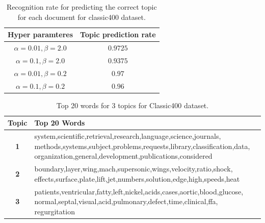 \documentclass[twoside,12pt]{article}
\begin{document}
\begin{table}[!]
\begin{center}
\begin{tabular}{| c | c |} 
\hline
\textbf{Hyper paramteres}& \textbf{Topic prediction rate}  \\ \hline

$\alpha=0.01,\beta=2.0$ & $0.9725$ \\ \hline
$\alpha=0.1,\beta=2.0$ &  $0.9375$ \\ \hline
$\alpha=0.01,\beta=0.2$ & $0.97$ \\ \hline
$\alpha=0.1,\beta=0.2$ & $0.96$ \\ \hline
 
\end{tabular}
\caption{Recognition rate for predicting the correct topic for each document for classic400 dataset.}
\label{tableClssicRecognition}
\end{center}
\end{table}

\begin{table}[!]
\begin{center}
\begin{tabular}{| c | p{12cm} |}
\hline
\textbf{Topic}& \textbf{Top 20 Words}  \\ \hline
\textbf{1}&system,scientific,retrieval,research,language,science,journals, methods,systems,subject,problems,requests,library,classification,data, organization,general,development,publications,considered\\ \hline
\textbf{2}&boundary,layer,wing,mach,supersonic,wings,velocity,ratio,shock, effects,surface,plate,lift,jet,numbers,solution,edge,high,speeds,heat\\
 \hline
\textbf{3}&patients,ventricular,fatty,left,nickel,acids,cases,aortic,blood,glucose, normal,septal,visual,acid,pulmonary,defect,time,clinical,ffa, regurgitation\\
 \hline
 
\end{tabular}
\caption{Top 20 words for 3 topics for Classic400 dataset. }
\label{tableTopWordsClassic}
\end{center}
\end{table}
\end{document}

